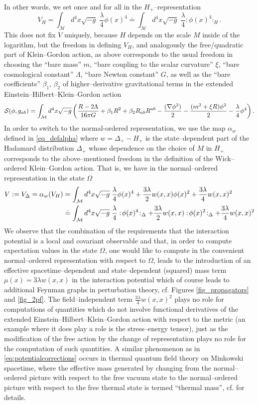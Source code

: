 \documentclass[10pt]{book}
\newcommand{\wick}[1]{:\!{#1}\!:}
\let\int\int
\newcommand{\Mcal}{\mathcal{M}}
\theoremstyle{break}
\begin{document}
In other words, we set once and for all in the $H_+$--representation 
$$
V_H=\int_\Mcal d^4x \sqrt{-g} \; \frac{\lambda}{4} \phi(x)^4\doteq \int_\Mcal d^4x \sqrt{-g} \; \frac{\lambda}{4} \wick{\phi(x)^4}_H.
$$
This does not fix $V$ uniquely, because $H$ depends on the scale $M$ inside of the logarithm, but the freedom in defining $V_H$, and analogously the free/quadratic part of Klein--Gordon action, as above corresponds to the usual freedom in choosing the ``bare mass'' $m$, ``bare coupling to the scalar curvature'' $\xi$, ``bare cosmological constant'' $\Lambda$, ``bare Newton constant'' $G$, as well as the ``bare coefficients'' $\beta_1$, $\beta_2$ of higher--derivative gravitational terms in the extended Einstein--Hilbert--Klein--Gordon action
$$
{\cal S}(\phi,g_{ab})=\int_\Mcal d^4x \sqrt{-g}\left(\frac{R-2\Lambda}{16 \pi G}+\beta_1 R^2 + \beta_2 R_{ab}R^{ab}-\frac{(\nabla \phi^2)}{2}-\frac{(m^2+\xi R )\phi^2}{2}-\frac{\lambda}{4}\phi^4\right).
$$
In order to switch to the normal-ordered representation, we use the map $\alpha_{w}$ defined in \eqref{eq_defalpha} where $w=\Delta_+-H_+$ is the state--dependent part of the Hadamard distribution $\Delta_+$ whose dependence on the choice of $M$ in $H_+$ corresponds to the above--mentioned freedom in the definition of the Wick--ordered Klein--Gordon action. That is, we have in the normal--ordered representation in the state $\Omega$
\begin{align}\label{eq:potentialcorrections}
V:=V_\Delta=\alpha_w(V_H)&=\int_\Mcal d^4x \sqrt{-g} \; \frac{\lambda}{4} \phi(x)^4 + \frac{3\lambda}{2}w(x,x)\phi(x)^2+\frac{3\lambda}{4} w(x,x)^2\\
&\doteq\int_\Mcal d^4x \sqrt{-g} \; \frac{\lambda}{4} \wick{\phi(x)^4}_\Delta + \frac{3\lambda}{2}w(x,x)\wick{\phi(x)^2}_\Delta+\frac{3\lambda}{4} w(x,x)^2\notag
\end{align}
We observe that the combination of the requirements that the interaction potential is a local and covariant observable and that, in order to compute expectation values in the state $\Omega$, one would like to compute in the convenient normal--ordered representation with respect to $\Omega$, leads to the introduction of an effective spacetime--dependent and state--dependent (squared) mass term $\mu(x)=3\lambda w(x,x)$ in the interaction potential which of course leads to additional Feynman graphs in perturbation theory, cf. Figures \ref{fig_propagators} and \ref{fig_2pf}. The field--independent term $\frac{3\lambda}{4} w(x,x)^2$ plays no role for computations of quantities which do not involve functional derivatives of the extended Einstein--Hilbert--Klein--Gordon action with respect to the metric (an example where it does play a role is the stress--energy tensor), just as the modification of the free action by the change of representation plays no role for the computation of such quantities. A similar phenomenon as in \eqref{eq:potentialcorrections} occurs in thermal quantum field theory on Minkowski spacetime, where the effective mass generated by changing from the normal--ordered picture with respect to the free vacuum state to the normal--ordered picture with respect to the free thermal state is termed ``thermal mass'', cf. \cite[Section 2.3.2.]{Lindner:2013ila} for details.
\end{document}
